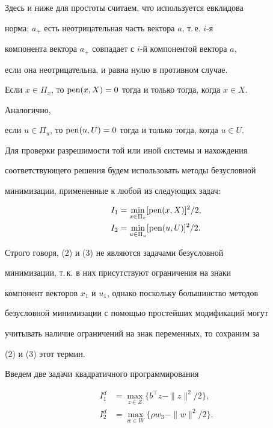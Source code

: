 Здесь и ниже для простоты считаем, что используется евклидова


норма; $a_+$ есть неотрицательная часть вектора $a$, т.\,е. $i$-я


компонента вектора $a_+$ совпадает с $i$-й компонентой вектора $a$,


если она неотрицательна, и равна нулю в противном случае.





Если $x\in\Pi_x$, то $\operatorname{pen}(x,X)=0$ тогда и только тогда, когда $x\in X$. 


Аналогично,


если $u\in\Pi_u$, то $\operatorname{pen}(u,U)=0$ тогда и только тогда, когда $u\in U$.





Для проверки разрешимости той или иной системы и нахождения


соответствующего решения будем использовать методы безусловной


минимизации, примененные к любой из следующих задач:


\begin{align}


I_1&=\min_{x\in\Pi_x}[\pen(x,X)]^2/2,\\


I_2&=\min_{u\in\Pi_u}[\pen(u,U)]^2/2.


\end{align}





Строго говоря, (2) и (3) не являются задачами безусловной


минимизации, т.\,к. в них присутствуют ограничения на знаки


компонент векторов $x_1$ и $u_1$, однако поскольку большинство методов


безусловной минимизации с помощью простейших модификаций могут


учитывать наличие ограничений на знак переменных, то сохраним за


(2) и (3) этот термин.





Введем две задачи квадратичного программирования


\begin{align}


I^d_1&=\max_{z\in Z}\{b^\top z-\|z\|^2/2\},\\


I^d_2&=\max_{w\in W}\{\rho w_3-\|w\|^2/2\}.


\end{align}





